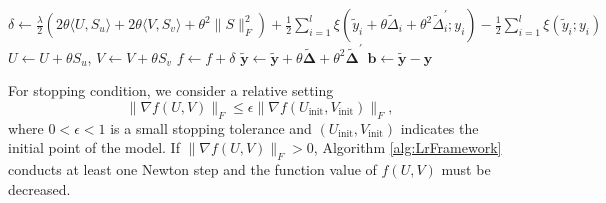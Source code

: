 \documentclass[11pt,twoside]{article}
\newcommand{\bsym}[1]{\ensuremath{\boldsymbol{#1}}}
\newcommand{\bb}{\ensuremath{\bsym{b}}}
\newcommand{\by}{\ensuremath{\bsym{y}}}
\newcommand{\byy}{\ensuremath{\bsym{\tilde{y}}}}
\begin{document}
\begin{algorithm}
\begin{algorithmic}[1]
                \State $\delta \gets \frac{\lambda}{2}\left( 2\theta \langle U, S_u \rangle + 2\theta \langle V, S_v \rangle + \theta^2\|S\|_F^2 \right) + \frac{1}{2} \sum_{i=1}^l \xi(\tilde{y}_i+\theta\tilde{\Delta}_i+{\theta}^2\tilde{\Delta}_i^\prime;y_i) - \frac{1}{2}\sum_{i=1}^l \xi(\tilde{y}_i;y_i)$
                    \State $U \gets U +\theta S_u$, $V \gets V +\theta S_v$
                    \State $f \gets f+ \delta$
                    \State $\bsym{\tilde{y}} \gets \bsym{\tilde{y}}+\theta\bsym{\tilde{\Delta}} +{\theta}^2 \bsym{\tilde{\Delta}}^\prime$
                    \State $\bb \leftarrow \byy - \by $
                \EndIf
            \EndFor
        \EndFor
    \end{algorithmic}
\end{algorithm}

For stopping condition, we consider a relative setting
\begin{equation}
    \|\nabla f(U,V)\|_F \le \epsilon \|\nabla f(U_{\text{init}},V_{\text{init}})\|_F,
    \label{eq:AntStop}
\end{equation}
where $0<\epsilon<1$ is a small stopping tolerance and $(U_{\text{init}},V_{\text{init}})$ indicates the initial point of the model. 
If $\|\nabla f(U,V)\|_F >0$, Algorithm \ref{alg:LrFramework} conducts at least one Newton step and the function value of $f(U,V)$ must be decreased. %
\end{document}
